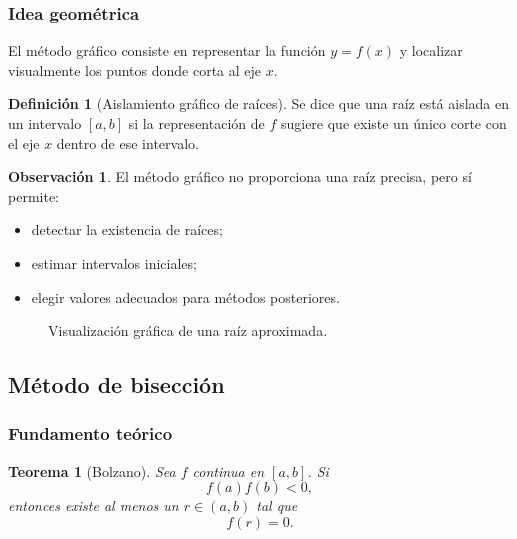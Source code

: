 \documentclass[a4paper,12pt]{article}
\theoremstyle{definition}
\newtheorem{definicion}{Definición}[section]
\newtheorem{observacion}{Observación}[section]
\theoremstyle{plain}
\newtheorem{teorema}{Teorema}[section]
\begin{document}
\subsubsection{Idea geométrica}

El método gráfico consiste en representar la función $y=f(x)$ y localizar
visualmente los puntos donde corta al eje $x$.

\begin{definicion}[Aislamiento gráfico de raíces]
Se dice que una raíz está aislada en un intervalo $[a,b]$ si la representación
de $f$ sugiere que existe un único corte con el eje $x$ dentro de ese
intervalo.
\end{definicion}

\begin{observacion}
El método gráfico no proporciona una raíz precisa, pero sí permite:
\begin{itemize}[leftmargin=1.5em]
    \item detectar la existencia de raíces;
    \item estimar intervalos iniciales;
    \item elegir valores adecuados para métodos posteriores.
\end{itemize}
\end{observacion}

\begin{figure}[H]
\centering
{}
\caption{Visualización gráfica de una raíz aproximada.}
\end{figure}

\subsection{Método de bisección}

\subsubsection{Fundamento teórico}

\begin{teorema}[Bolzano]
Sea $f$ continua en $[a,b]$. Si
\[
f(a)f(b)<0,
\]
entonces existe al menos un $r\in(a,b)$ tal que
\[
f(r)=0.
\]
\end{teorema}
\end{document}
